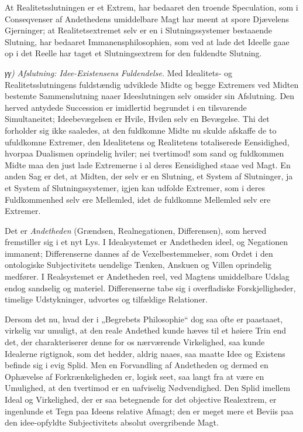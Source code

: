 \documentclass[12pt]{book}
\newcommand{\opage}[1]{\marginnote{\footnotesize\textit{[#1]}}}
\begin{document}
At Realitetsslutningen er et Extrem, har bedaaret den troende Speculation, som i Conseqvenser af Andethedens umiddelbare Magt har meent at spore Djævelens Gjerninger; at Realitetsextremet selv er en i Slutningssystemer bestaaende Slutning, har bedaaret Immanensphilosophien, som ved at lade det Ideelle gaae op i det Reelle har taget et Slutningsextrem for den fuldendte Slutning.

\textit{γγ)} \emph{Afslutning: Idee-Existensens Fuldendelse.} Med Idealitets- og Realitetsslutningens fuldstændig udviklede Midte og begge Extremers ved Midten bestemte Sammenslutning naaer Ideeslutningen selv omsider sin Afslutning. Den herved antydede Succession er imidlertid begrundet i en tilsvarende Simultaneitet; Ideebevægelsen er Hvile, Hvilen selv en Bevægelse. Thi det forholder sig ikke saaledes, at den fuldkomne Midte nu skulde afskaffe de to ufuldkomne Extremer, den Idealitetens og Realitetens totaliserede Eensidighed, hvorpaa Dualismen oprindelig hviler; nei tvertimod! som sand og fuldkommen Midte maa den just lade Extremerne i al deres Eensidighed staae ved Magt. En anden
\opage{457}Sag er det, at Midten, der selv er en Slutning, et System af Slutninger, ja et System af Slutningssystemer, igjen kan udfolde Extremer, som i deres Fuldkommenhed selv ere Mellemled, idet de fuldkomne Mellemled selv ere Extremer.

Det er \emph{Andetheden} (Grændsen, Realnegationen, Differensen), som herved fremstiller sig i et nyt Lys. I Idealsystemet er Andetheden ideel, og Negationen immanent; Differenserne dannes af de Vexelbestemmelser, som Ordet i den ontologiske Subjectivitets uendelige Tænken, Anskuen og Villen oprindelig medfører. I Realsystemet er Andetheden reel, ved Magtens umiddelbare Udslag endog sandselig og materiel. Differenserne tabe sig i overfladiske Forskjelligheder, timelige Udstykninger, udvortes og tilfældige Relationer.

Dersom det nu, hvad der i „Begrebets Philosophie“ dog saa ofte er paastaaet, virkelig var umuligt, at den reale Andethed kunde hæves til et høiere Trin end det, der charakteriserer denne for os nærværende Virkelighed, saa kunde Idealerne rigtignok, som det hedder, aldrig naaes, saa maatte Idee og Existens befinde sig i evig Splid. Men en Forvandling af Andetheden og dermed en Ophævelse af Forkrænkeligheden er, logisk seet, saa langt fra at være en Umulighed, at den tvertimod er en uafviselig Nødvendighed. Den Splid imellem Ideal og Virkelighed, der er saa betegnende for det objective Realextrem, er ingenlunde et Tegn paa Ideens relative Afmagt; den er meget mere et Beviis paa den idee-opfyldte Subjectivitets absolut overgribende Magt.
\end{document}
